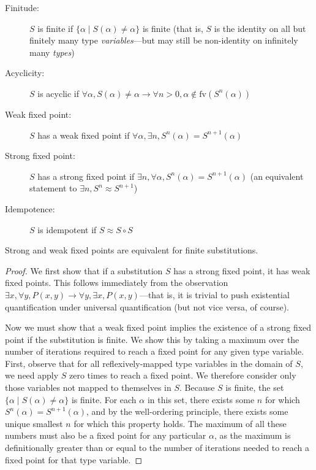 \documentclass[10pt, letterpaper, oneside]{article}
\newcommand{\fv}{\mathrm{fv}}
\begin{document}
\begin{description}
\item[Finitude:] \(S\) is finite if \(\{\alpha \mid S(\alpha) \ne \alpha\}\) is finite (that is, \(S\) is the identity on all but finitely many type \emph{variables}---but may still be non-identity on infinitely many \emph{types})
\item[Acyclicity:] \(S\) is acyclic if \(\forall \alpha, S(\alpha) \ne \alpha \to \forall n > 0, \alpha \notin \fv(S^n(\alpha))\)
\item[Weak fixed point:] \(S\) has a weak fixed point if \(\forall \alpha, \exists n, S^n(\alpha) = S^{n + 1}(\alpha)\)
\item[Strong fixed point:] \(S\) has a strong fixed point if \(\exists n, \forall \alpha, S^n(\alpha) = S^{n + 1}(\alpha)\) (an equivalent statement to \(\exists n, S^n \approx S^{n + 1}\))
\item[Idempotence:] \(S\) is idempotent if \(S \approx S \circ S\)
\end{description}

\newpage

\begin{lemma}
  \label{lemma:strong-weak}
  Strong and weak fixed points are equivalent for finite substitutions.
\end{lemma}

\begin{proof}
  We first show that if a substitution \(S\) has a strong fixed point, it has weak fixed points. This follows immediately from the observation \(\exists x, \forall y, P(x,y) \to \forall y, \exists x, P(x,y)\)---that is, it is trivial to push existential quantification under universal quantification (but not vice versa, of course).

  Now we must show that a weak fixed point implies the existence of a strong fixed point if the substitution is finite. We show this by taking a maximum over the number of iterations required to reach a fixed point for any given type variable. First, observe that for all reflexively-mapped type variables in the domain of \(S\), we need apply \(S\) zero times to reach a fixed point. We therefore consider only those variables not mapped to themselves in \(S\). Because \(S\) is finite, the set \(\{\alpha \mid S(\alpha) \ne \alpha\}\) is finite. For each \(\alpha\) in this set, there exists some \(n\) for which \(S^n(\alpha) = S^{n + 1}(\alpha)\), and by the well-ordering principle, there exists some unique smallest \(n\) for which this property holds. The maximum of all these numbers must also be a fixed point for any particular \(\alpha\), as the maximum is definitionally greater than or equal to the number of iterations needed to reach a fixed point for that type variable.
\end{proof}
\end{document}
